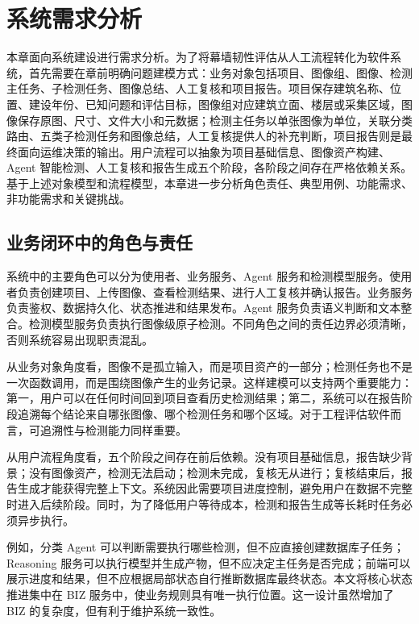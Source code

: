 \chapter{系统需求分析}
\label{chap:problem-requirements}

本章面向系统建设进行需求分析。为了将幕墙韧性评估从人工流程转化为软件系统，首先需要在章前明确问题建模方式：业务对象包括项目、图像组、图像、检测主任务、子检测任务、图像总结、人工复核和项目报告。项目保存建筑名称、位置、建设年份、已知问题和评估目标，图像组对应建筑立面、楼层或采集区域，图像保存原图、尺寸、文件大小和元数据；检测主任务以单张图像为单位，关联分类路由、五类子检测任务和图像总结，人工复核提供人的补充判断，项目报告则是最终面向运维决策的输出。用户流程可以抽象为项目基础信息、图像资产构建、Agent 智能检测、人工复核和报告生成五个阶段，各阶段之间存在严格依赖关系。基于上述对象模型和流程模型，本章进一步分析角色责任、典型用例、功能需求、非功能需求和关键挑战。

\section{业务闭环中的角色与责任}
\label{sec:req-role-responsibility}

系统中的主要角色可以分为使用者、业务服务、Agent 服务和检测模型服务。使用者负责创建项目、上传图像、查看检测结果、进行人工复核并确认报告。业务服务负责鉴权、数据持久化、状态推进和结果发布。Agent 服务负责语义判断和文本整合。检测模型服务负责执行图像级原子检测。不同角色之间的责任边界必须清晰，否则系统容易出现职责混乱。

从业务对象角度看，图像不是孤立输入，而是项目资产的一部分；检测任务也不是一次函数调用，而是围绕图像产生的业务记录。这样建模可以支持两个重要能力：第一，用户可以在任何时间回到项目查看历史检测结果；第二，系统可以在报告阶段追溯每个结论来自哪张图像、哪个检测任务和哪个区域。对于工程评估软件而言，可追溯性与检测能力同样重要。

从用户流程角度看，五个阶段之间存在前后依赖。没有项目基础信息，报告缺少背景；没有图像资产，检测无法启动；检测未完成，复核无从进行；复核结束后，报告生成才能获得完整上下文。系统因此需要项目进度控制，避免用户在数据不完整时进入后续阶段。同时，为了降低用户等待成本，检测和报告生成等长耗时任务必须异步执行。

例如，分类 Agent 可以判断需要执行哪些检测，但不应直接创建数据库子任务；Reasoning 服务可以执行模型并生成产物，但不应决定主任务是否完成；前端可以展示进度和结果，但不应根据局部状态自行推断数据库最终状态。本文将核心状态推进集中在 BIZ 服务中，使业务规则具有唯一执行位置。这一设计虽然增加了 BIZ 的复杂度，但有利于维护系统一致性。

